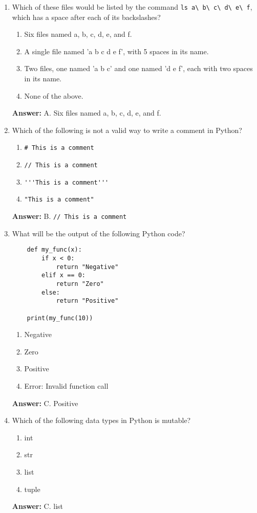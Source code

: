 \documentclass{article}
\begin{document}
\begin{enumerate}
    \item Which of these files would be listed by the command \verb|ls a\ b\ c\ d\ e\ f|, which has a space after each of its backslashes?
    \begin{enumerate}
        \item Six files named a, b, c, d, e, and f.
        \item A single file named 'a b c d e f', with 5 spaces in its name.
        \item Two files, one named 'a b c' and one named 'd e f', each with two spaces in its name.
        \item None of the above.
    \end{enumerate}
    \textbf{Answer:} A. Six files named a, b, c, d, e, and f.

    \item Which of the following is not a valid way to write a comment in Python?
    \begin{enumerate}
        \item \verb|# This is a comment|
        \item \verb|// This is a comment|
        \item \verb|'''This is a comment'''|
        \item \verb|"This is a comment"|
    \end{enumerate}
    \textbf{Answer:} B. \verb|// This is a comment|

    \item What will be the output of the following Python code?

    \begin{verbatim}
    def my_func(x):
        if x < 0:
            return "Negative"
        elif x == 0:
            return "Zero"
        else:
            return "Positive"

    print(my_func(10))
    \end{verbatim}

    \begin{enumerate}
        \item Negative
        \item Zero
        \item Positive
        \item Error: Invalid function call
    \end{enumerate}
    \textbf{Answer:} C. Positive

    \item Which of the following data types in Python is mutable?
    \begin{enumerate}
        \item int
        \item str
        \item list
        \item tuple
    \end{enumerate}
    \textbf{Answer:} C. list


\end{enumerate}
\end{document}

